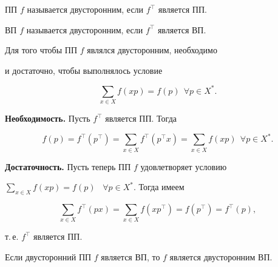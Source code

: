 \begin{defn}


ПП $f$ называется двусторонним, если $f^\top$ является ПП.


\end{defn}





\begin{defn}


ВП $f$ называется двусторонним, если $f^\top$ является ВП.


\end{defn}





\begin{thm}


Для того чтобы ПП $f$ являлся двусторонним, необходимо 


и достаточно, чтобы выполнялось условие


$$


\sum_{x\in X}f(xp)=f(p)\ \ \forall p\in X^*.


$$


\end{thm}





\begin{pf}


{\bf Необходимость.} Пусть $f^\top$ является ПП. Тогда


$$


f(p)=f^\top(p^\top)=\sum_{x\in X}f^\top(p^\top x)=


\sum_{x\in X}f(xp)\ \ \forall p\in X^*.


$$





{\bf Достаточность.} Пусть теперь ПП $f$ удовлетворяет условию


$\sum\limits_{x\in X}f(xp)=f(p)$ \ $\forall p\in X^*$. Тогда имеем


$$


\sum_{x\in X}f^\top(px)=\sum_{x\in X}f(xp^\top)=f(p^\top)=f^\top(p),


$$


т.\,е. $f^\top$ является ПП.


\end{pf}





\begin{thm}


Если двусторонний ПП $f$ является ВП, то $f$ является двусторонним ВП.


\end{thm}





